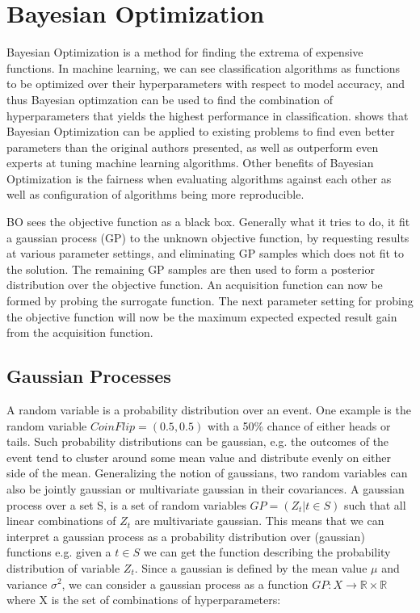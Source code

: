 \section{Bayesian Optimization}\label{sec:bayesian-optimization}
Bayesian Optimization is a method for finding the extrema of expensive functions. In machine learning, we can see classification algorithms as functions to be optimized over their hyperparameters with respect to model accuracy, and thus Bayesian optimzation can be used to find the combination of hyperparameters that yields the highest performance in classification. \citet{snoek2012practical} shows that Bayesian Optimization can be applied to existing problems to find even better parameters than the original authors presented, as well as outperform even experts at tuning machine learning algorithms. Other benefits of Bayesian Optimization is the fairness when evaluating algorithms against each other as well as configuration of algorithms being more reproducible.

BO sees the objective function as a black box. Generally what it tries to do, it fit a gaussian process (GP) to the unknown objective function, by requesting results at various parameter settings, and eliminating GP samples which does not fit to the solution. The remaining GP samples are then used to form a posterior distribution over the objective function. An acquisition function can now be formed by probing the surrogate function. The next parameter setting for probing the objective function will now be the maximum expected expected result gain from the acquisition function.
\begin{algorithm}
\end{algorithm}
\subsection{Gaussian Processes}
A random variable is a probability distribution over an event. One example is the random variable $CoinFlip = (0.5, 0.5)$ with a 50\% chance of either heads or tails. Such probability distributions can be gaussian, e.g. the outcomes of the event tend to cluster around some mean value and distribute evenly on either side of the mean. Generalizing the notion of gaussians, two random variables can also be jointly gaussian or multivariate gaussian in their covariances. A gaussian process over a set S, is a set of random variables $GP = (Z_t | t \in S)$ such that all linear combinations of $Z_t$ are multivariate gaussian. This means that we can interpret a gaussian process as a probability distribution over (gaussian) functions e.g. given a $t \in S$ we can get the function describing the probability distribution of variable $Z_t$. Since a gaussian is defined by the mean value $\mu$ and variance $\sigma^2$, we can consider a gaussian process as a function $GP : X \rightarrow \mathbb{R} \times \mathbb{R}$ where X is the set of combinations of hyperparameters:


